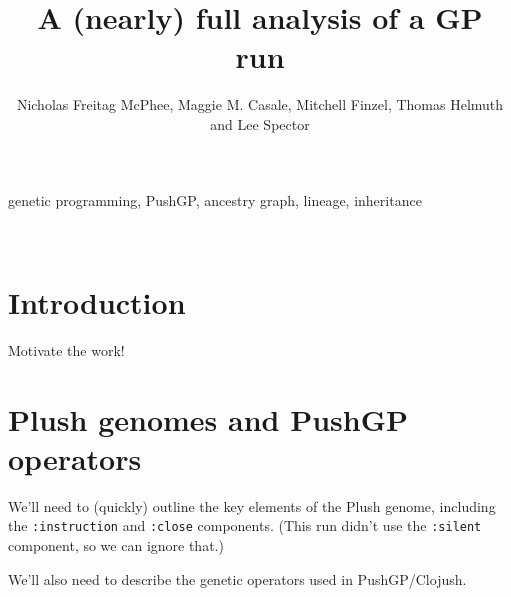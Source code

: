 %

\title*{A (nearly) full analysis of a GP run}
\author{Nicholas Freitag McPhee, Maggie M. Casale, Mitchell Finzel, Thomas Helmuth and Lee Spector}

\maketitle


\begin{keywords}
	genetic programming, PushGP, ancestry graph, lineage, inheritance
\end{keywords}
\\
\section{Introduction}
\label{sec:introduction}

Motivate the work!

\section{Plush genomes and PushGP operators}
\label{sec:background}


We'll need to (quickly) outline the key elements of the Plush genome, including
the \texttt{:instruction} and \texttt{:close} components. (This run didn't use the
\texttt{:silent} component, so we can ignore that.)

We'll also need to describe the genetic operators used in PushGP/Clojush.

